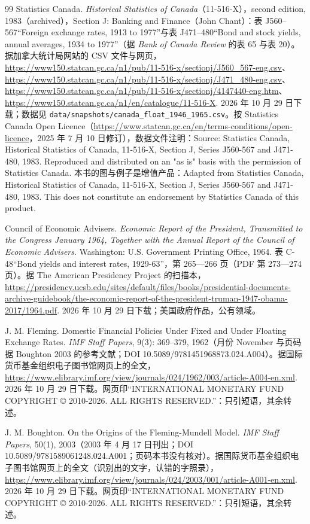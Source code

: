 \begin{thebibliography}{99}
 Statistics Canada. \emph{Historical Statistics of Canada}（11-516-X），second edition, 1983（archived），Section J: Banking and Finance（John Chant）：表 J560--567“Foreign exchange rates, 1913 to 1977”与表 J471--480“Bond and stock yields, annual averages, 1934 to 1977”（据 \emph{Bank of Canada Review} 的表 65 与表 20）。据加拿大统计局网站的 CSV 文件与网页，\url{https://www150.statcan.gc.ca/n1/pub/11-516-x/sectionj/J560_567-eng.csv}、\url{https://www150.statcan.gc.ca/n1/pub/11-516-x/sectionj/J471_480-eng.csv}、\url{https://www150.statcan.gc.ca/n1/pub/11-516-x/sectionj/4147440-eng.htm}、\url{https://www150.statcan.gc.ca/n1/en/catalogue/11-516-X}. 2026 年 10 月 29 日下载；数据见 \texttt{data/snapshots/canada\_float\_1946\_1965.csv}。按 Statistics Canada Open Licence（\url{https://www.statcan.gc.ca/en/terms-conditions/open-licence}，2025 年 7 月 10 日修订），数据文件注明：Source: Statistics Canada, Historical Statistics of Canada, 11-516-X, Section J, Series J560-567 and J471-480, 1983. Reproduced and distributed on an "as is" basis with the permission of Statistics Canada. 本书的图与例子是增值产品：Adapted from Statistics Canada, Historical Statistics of Canada, 11-516-X, Section J, Series J560-567 and J471-480, 1983. This does not constitute an endorsement by Statistics Canada of this product.

 Council of Economic Advisers. \emph{Economic Report of the President, Transmitted to the Congress January 1964, Together with the Annual Report of the Council of Economic Advisers}. Washington: U.S. Government Printing Office, 1964. 表 C-48“Bond yields and interest rates, 1929-63”，第 265—266 页（PDF 第 273—274 页）。据 The American Presidency Project 的扫描本，\url{https://presidency.ucsb.edu/sites/default/files/books/presidential-documents-archive-guidebook/the-economic-report-of-the-president-truman-1947-obama-2017/1964.pdf}. 2026 年 10 月 29 日下载；美国政府作品，公有领域。

 J. M. Fleming. Domestic Financial Policies Under Fixed and Under Floating Exchange Rates. \emph{IMF Staff Papers}, 9(3): 369--379, 1962（月份 November 与页码据 Boughton 2003 的参考文献；DOI 10.5089/9781451968873.024.A004）。据国际货币基金组织电子图书馆网页上的全文，\url{https://www.elibrary.imf.org/view/journals/024/1962/003/article-A004-en.xml}. 2026 年 10 月 29 日下载。网页印“INTERNATIONAL MONETARY FUND COPYRIGHT © 2010-2026. ALL RIGHTS RESERVED.”：只引短语，其余转述。

 J. M. Boughton. On the Origins of the Fleming-Mundell Model. \emph{IMF Staff Papers}, 50(1), 2003（2003 年 4 月 17 日刊出；DOI 10.5089/9781589061248.024.A001；页码本书没有核对）。据国际货币基金组织电子图书馆网页上的全文（识别出的文字，认错的字照录），\url{https://www.elibrary.imf.org/view/journals/024/2003/001/article-A001-en.xml}. 2026 年 10 月 29 日下载。网页印“INTERNATIONAL MONETARY FUND COPYRIGHT © 2010-2026. ALL RIGHTS RESERVED.”：只引短语，其余转述。


\end{thebibliography}
